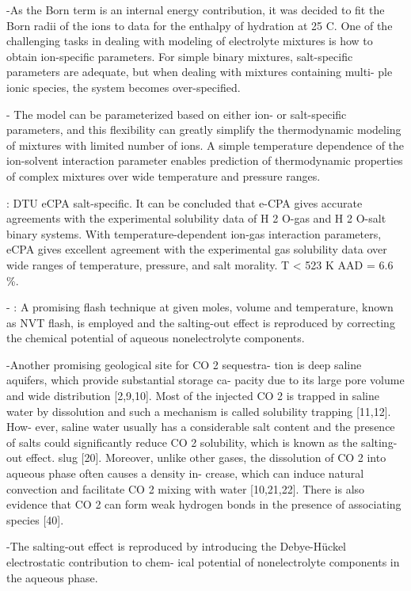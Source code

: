 -As the Born term is an internal energy contribution, it was decided
to fit the Born radii of the ions to data for the enthalpy of
hydration at 25 C. One of the challenging tasks in dealing with modeling of
electrolyte mixtures is how to obtain ion-specific parameters. For simple binary mixtures, salt-specific parameters are
adequate, but when dealing with mixtures containing multi-
ple ionic species, the system becomes over-specified.

- The model can be parameterized based on either ion- or salt-specific parameters, and this flexibility can greatly simplify the thermodynamic modeling of mixtures with limited number of ions. A
simple temperature dependence of the ion-solvent interaction
parameter enables prediction of thermodynamic properties of
complex mixtures over wide temperature and pressure
ranges.



\cite{Sun2019}: DTU eCPA salt-specific. It can be concluded that e-CPA gives
accurate agreements with the experimental solubility data of
H 2 O-gas and H 2 O-salt binary systems. With temperature-dependent ion-gas interaction parameters, eCPA gives
excellent agreement with the experimental gas solubility data
over wide ranges of temperature, pressure, and salt morality.  T < 523 K AAD = 6.6 \%.


- \cite{Li2020}: A promising ﬂash technique at given moles, volume and temperature, known as NVT ﬂash, is employed and the salting-out effect is reproduced by correcting the chemical potential of aqueous nonelectrolyte components.

-Another promising geological site for CO 2 sequestra-
tion is deep saline aquifers, which provide substantial storage ca-
pacity due to its large pore volume and wide distribution [2,9,10].
Most of the injected CO 2 is trapped in saline water by dissolution
and such a mechanism is called solubility trapping [11,12]. How-
ever, saline water usually has a considerable salt content and the
presence of salts could signiﬁcantly reduce CO 2 solubility, which is
known as the salting-out effect. slug [20]. Moreover, unlike other gases, the
dissolution of CO 2 into aqueous phase often causes a density in-
crease, which can induce natural convection and facilitate CO 2
mixing with water [10,21,22]. There is also evidence that CO 2 can
form weak hydrogen bonds in the presence of associating species
[40].

-The salting-out effect is reproduced by
introducing the Debye-Hückel electrostatic contribution to chem-
ical potential of nonelectrolyte components in the aqueous phase.

